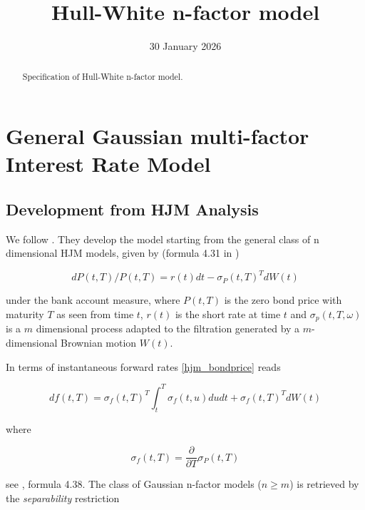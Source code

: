 \documentclass{amsart}
\theoremstyle{plain}
\numberwithin{equation}{section}
\begin{document}
\title{Hull-White n-factor model}

\date{30 January 2026}

\begin{abstract}
Specification of Hull-White n-factor model.
\end{abstract}
\maketitle

\tableofcontents

\section{General Gaussian multi-factor Interest Rate Model}\label{sec:general_gaussian_nfactor_model}

\subsection{Development from HJM Analysis}

We follow \cite{Andersen_Piterbarg_2010}. They develop the model starting from the general class of n dimensional HJM
models, given by (formula 4.31 in \cite{Andersen_Piterbarg_2010})

\begin{equation}\label{hjm_bondprice}
dP(t,T) / P(t,T) = r(t) dt - \sigma_P(t,T)^T dW(t)
\end{equation}

under the bank account measure, where $P(t,T)$ is the zero bond price with maturity $T$ as seen from time $t$, $r(t)$ is
the short rate at time $t$ and $\sigma_p(t,T,\omega)$ is a $m$ dimensional process adapted to the filtration generated
by a $m$-dimensional Brownian motion $W(t)$.

In terms of instantaneous forward rates \ref{hjm_bondprice} reads

\begin{equation}\label{hjm_forwards}
df(t,T) = \sigma_f(t,T)^T \int_t^T \sigma_f(t,u) du dt + \sigma_f(t,T)^T dW(t)
\end{equation}

where

\begin{equation}
\sigma_f(t,T) = \frac{\partial}{\partial T}\sigma_P(t,T)
\end{equation}

see \cite{Andersen_Piterbarg_2010}, formula 4.38. The class of Gaussian n-factor models ($n\geq m$) is retrieved by the
{\em separability} restriction
\end{document}
